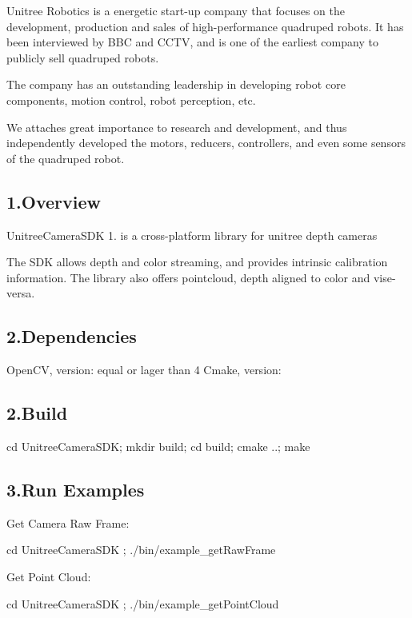 Unitree Robotics is a energetic start-\/up company that focuses on the development, production and sales of high-\/performance quadruped robots. It has been interviewed by B\+BC and C\+C\+TV, and is one of the earliest company to publicly sell quadruped robots.

The company has an outstanding leadership in developing robot core components, motion control, robot perception, etc.

We attaches great importance to research and development, and thus independently developed the motors, reducers, controllers, and even some sensors of the quadruped robot.

\subsection*{1.\+Overview }

Unitree\+Camera\+S\+DK 1. is a cross-\/platform library for unitree depth cameras

The S\+DK allows depth and color streaming, and provides intrinsic calibration information. The library also offers pointcloud, depth aligned to color and vise-\/versa.

\subsection*{2.\+Dependencies }

Open\+CV, version\+: equal or lager than 4 Cmake, version\+:

\subsection*{2.\+Build }


\begin{DoxyCode}
cd UnitreeCameraSDK;
mkdir build; cd build;
cmake ..; make
\end{DoxyCode}


\subsection*{3.\+Run Examples }

Get Camera Raw Frame\+: 
\begin{DoxyCode}
cd UnitreeCameraSDK ; 
./bin/example\_getRawFrame 
\end{DoxyCode}
 Get Point Cloud\+: 
\begin{DoxyCode}
cd UnitreeCameraSDK ; 
./bin/example\_getPointCloud
\end{DoxyCode}
 